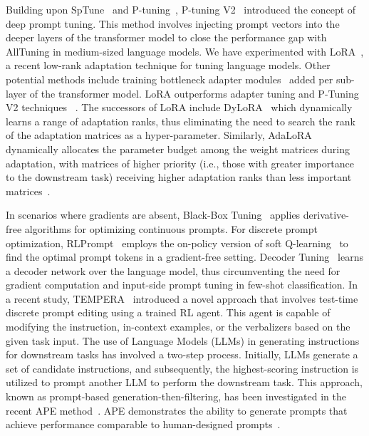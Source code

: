 \documentclass[11pt]{article}
\begin{document}
Building upon SpTune~\cite{lester-etal-2021-power} and P-tuning~\cite{li-liang-2021-prefix}, P-tuning V2~\cite{liu-etal-2022-p} introduced the concept of deep prompt tuning. This method involves injecting prompt vectors into the deeper layers of the transformer model to close the performance gap with AllTuning in medium-sized language models. We have experimented with LoRA~\cite{DBLP:journals/corr/abs-2106-09685}, a recent low-rank adaptation technique for tuning language models. Other potential methods include training bottleneck adapter modules~\cite{DBLP:journals/corr/abs-1902-00751, lin-etal-2020-exploring} added per sub-layer of the transformer model. LoRA outperforms adapter tuning and P-Tuning V2 techniques ~\cite{DBLP:journals/corr/abs-2106-09685}. The successors of LoRA include DyLoRA~\cite{valipour-etal-2023-dylora}  which dynamically learns a range of adaptation ranks, thus eliminating the need to search the rank of the adaptation matrices as a hyper-parameter. Similarly, AdaLoRA dynamically allocates the parameter budget among the weight matrices during adaptation, with matrices of higher priority (i.e., those with greater importance to the downstream task) receiving higher adaptation ranks than less important matrices~\cite{zhang2023adaptive}.

In scenarios where gradients are absent, Black-Box Tuning~\cite{DBLP:journals/corr/abs-2201-03514} applies derivative-free algorithms for optimizing continuous prompts. For discrete prompt optimization, RLPrompt~\cite{deng-etal-2022-rlprompt} employs the on-policy version of soft Q-learning~\cite{https://doi.org/10.48550/arxiv.2106.07704} to find the optimal prompt tokens in a gradient-free setting. Decoder Tuning~\cite{cui-etal-2023-decoder} learns a decoder network over the language model, thus circumventing the need for gradient computation and input-side prompt tuning in few-shot classification. In a recent study, TEMPERA~\cite{zhang2022tempera} introduced a novel approach that involves test-time discrete prompt editing using a trained RL agent. This agent is capable of modifying the instruction, in-context examples, or the verbalizers based on the given task input. The use of Language Models (LLMs) in generating instructions for downstream tasks has involved a two-step process. Initially, LLMs generate a set of candidate instructions, and subsequently, the highest-scoring instruction is utilized to prompt another LLM to perform the downstream task. This approach, known as prompt-based generation-then-filtering, has been investigated in the recent APE method~\cite{zhou2023large}. APE demonstrates the ability to generate prompts that achieve performance comparable to human-designed prompts~\cite{zhou2023large}.
\end{document}

